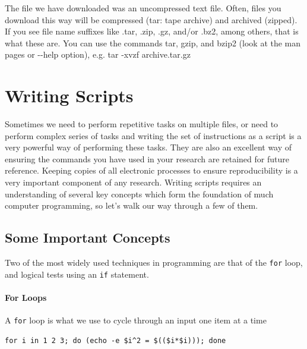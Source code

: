 \documentclass[a4paper,12pt,twoside]{memoir}
\begin{document}
\begin{information}
The file we have downloaded was an uncompressed text file. 
Often, files you download this way will be compressed (tar: tape archive) and archived (zipped). 
If you see file name suffixes like .tar, .zip, .gz, and/or .bz2, among others, that is what these are.  
You can use the commands tar, gzip, and bzip2 (look at the man pages or -{}-help option), e.g. tar -xvzf archive.tar.gz
\end{information}

\chapter{Writing Scripts}
Sometimes we need to perform repetitive tasks on multiple files, or need to perform complex series of tasks and writing the set of instructions as a script is a very powerful way of performing these tasks.
They are also an excellent way of ensuring the commands you have used in your research are retained for future reference.
Keeping copies of all electronic processes to ensure reproducibility is a very important component of any research. 
Writing scripts requires an understanding of several key concepts which form the foundation of much computer programming, so let's walk our way through a few of them. \\

\section{Some Important Concepts}

Two of the most widely used techniques in programming are that of the \texttt{for} loop, and logical tests using an \texttt{if} statement.

\subsubsection*{For Loops}

A \texttt{for} loop is what we use to cycle through an input one item at a time 
\begin{steps}
\begin{lstlisting}
for i in 1 2 3; do (echo -e $i^2 = $(($i*$i))); done
\end{lstlisting}
\end{steps}
\end{document}
